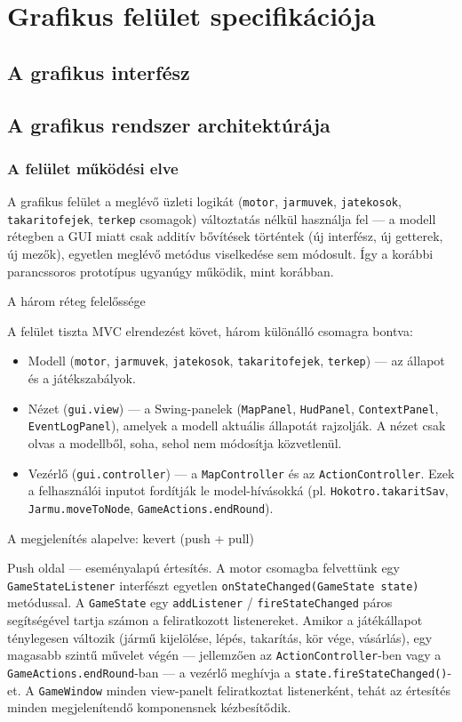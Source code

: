 \chapter{Grafikus felület specifikációja}

\section{A grafikus interfész}

\section{A grafikus rendszer architektúrája}
\subsection{A felület működési elve}
A grafikus felület a meglévő üzleti logikát (\texttt{motor}, \texttt{jarmuvek}, \texttt{jatekosok}, \texttt{takaritofejek}, \texttt{terkep} csomagok) változtatás nélkül használja fel — a modell rétegben a GUI miatt csak additív bővítések történtek (új interfész, új getterek, új mezők), egyetlen meglévő metódus viselkedése sem módosult. Így a korábbi parancssoros prototípus ugyanúgy működik, mint korábban.

A három réteg felelőssége

A felület tiszta MVC elrendezést követ, három különálló csomagra bontva:
\begin{itemize}
    \item Modell (\texttt{motor}, \texttt{jarmuvek}, \texttt{jatekosok}, \texttt{takaritofejek}, \texttt{terkep}) — az állapot és a játékszabályok.
    \item Nézet (\texttt{gui.view}) — a Swing-panelek (\texttt{MapPanel}, \texttt{HudPanel}, \texttt{ContextPanel}, \texttt{EventLogPanel}), amelyek a modell aktuális állapotát rajzolják. A nézet csak olvas a modellből, soha, sehol nem módosítja közvetlenül.
    \item Vezérlő (\texttt{gui.controller}) — a \texttt{MapController} és az \texttt{ActionController}. Ezek a felhasználói inputot fordítják le model-hívásokká (pl. \texttt{Hokotro.takaritSav}, \texttt{Jarmu.moveToNode}, \texttt{GameActions.endRound}).
\end{itemize}

A megjelenítés alapelve: kevert (push + pull)

Push oldal — eseményalapú értesítés. A motor csomagba felvettünk egy \texttt{GameStateListener} interfészt egyetlen \texttt{onStateChanged(GameState state)} metódussal. A \texttt{GameState} egy \texttt{addListener} / \texttt{fireStateChanged} páros segítségével tartja számon a feliratkozott listenereket. Amikor a játékállapot ténylegesen változik (jármű kijelölése, lépés, takarítás, kör vége, vásárlás), egy magasabb szintű művelet végén — jellemzően az \texttt{ActionController}-ben vagy a \texttt{GameActions.endRound}-ban — a vezérlő meghívja a \texttt{state.fireStateChanged()}-et. A \texttt{GameWindow} minden view-panelt feliratkoztat listenerként, tehát az értesítés minden megjelenítendő komponensnek kézbesítődik.

